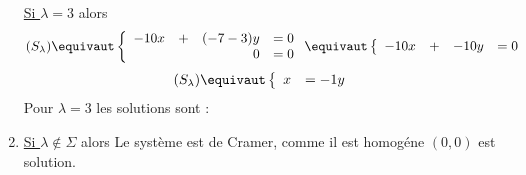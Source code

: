 \documentclass[a4paper, 11pt,reqno]{article}
\begin{document}
\begin{correction}
\begin{enumerate}
\underline{Si $\lambda =3$} alors 
$$(S_\lambda)\equivaut \left\{\begin{array}{rcrl}
-10x&+&(-7-3)y&=0\\
& &0&=0
\end{array}\right.\equivaut \left\{\begin{array}{rcrl}
-10x&+&-10y&=0
\end{array}\right.
$$
$$(S_\lambda)\equivaut\left\{\begin{array}{rl}
x&=-1y
\end{array}\right.
$$
Pour $\lambda=3$ les solutions sont :

\item \underline{Si $\lambda \notin \Sigma$} alors 
Le système est de Cramer, comme il est homogéne $(0,0)$ est solution. 
\end{enumerate}

\end{correction}
\end{document}
